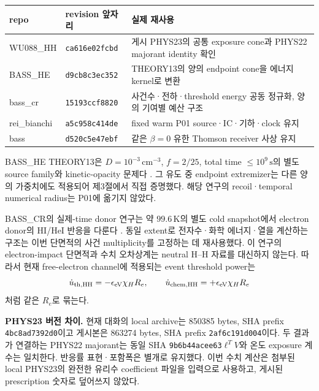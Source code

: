 \documentclass[11pt,a4paper]{article}
\begin{document}
\begin{center}\begin{tabularx}{\linewidth}{@{}p{23mm}p{26mm}X@{}}\toprule
repo & revision 앞자리 & 실제 재사용\\\midrule
WU088\_HH & \texttt{ca616e02fcbd} & 게시 PHYS23의 공통 exposure cone과 PHYS22 majorant identity 확인\\
BASS\_HE & \texttt{d9cb8c3ec352} & THEORY13의 양의 endpoint cone을 에너지 kernel로 변환\\
bass\_cr & \texttt{15193ccf8820} & 사건수·전하·threshold energy 공동 정규화, 양의 기여별 예산 구조\\
rei\_bianchi & \texttt{a5c958c414de} & fixed warm P01 source·IC·기하·clock 유지\\
bass & \texttt{d520c5e47ebf} & 같은 $\beta=0$ 유한 Thomson receiver 사상 유지\\\bottomrule
\end{tabularx}\end{center}

BASS\_HE THEORY13은 $D=10^{-3}\,\mathrm{cm^{-3}}$, $f=2/25$, total time $\le10^9\,\mathrm s$의 별도 source family와 kinetic-opacity 문제다 \cite{he13}. 그 유도 중 endpoint extremizer는 다른 양의 가중치에도 적용되어 제3절에서 직접 증명했다. 해당 연구의 recoil·temporal numerical radius는 P01에 옮기지 않았다.

BASS\_CR의 실제-time donor 연구는 약 $99.6\,\mathrm K$의 별도 cold snapshot에서 electron donor의 HI/HeI 반응을 다룬다 \cite{crtime}. 동일 extent로 전자수·화학 에너지·열을 계산하는 구조는 이번 단면적의 사건 multiplicity를 고정하는 데 재사용했다. 이 연구의 electron-impact 단면적과 수치 오차상계는 neutral H--H 자료를 대신하지 않는다. 따라서 현재 free-electron channel에 적용되는 event threshold power는
\begin{equation}
\dot u_{\rm th,HH}=-\epsilon_{\mathrm{eV}}\chi_H R_e,\qquad
\dot u_{\rm chem,HH}=+\epsilon_{\mathrm{eV}}\chi_H R_e
\end{equation}
처럼 같은 $R_e$로 묶는다.

\textbf{PHYS23 버전 차이.} 현재 대화의 local archive는 850385 bytes, SHA prefix \texttt{4bc8ad7392d0}이고 게시본은 863274 bytes, SHA prefix \texttt{2af6c191d004}이다. 두 결과가 연결하는 PHYS22 majorant는 동일 SHA \texttt{9b6b44acee63} $\ell^TV$와 온도 exposure 계수는 일치한다. 반응률 표현·포함폭은 별개로 유지했다. 이번 수치 계산은 첨부된 local PHYS23의 완전한 유리수 coefficient 파일을 입력으로 사용하고, 게시된 prescription 숫자로 덮어쓰지 않았다.

\newpage
\end{document}
